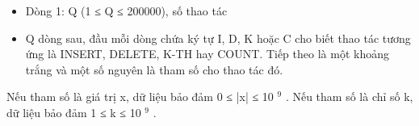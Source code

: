 \begin{itemize}
	\item     Dòng 1: Q (1 ≤ Q ≤ 200000), số thao tác   
	\item     Q dòng sau, đầu mỗi dòng chứa ký tự I, D, K hoặc C cho biết thao tác tương ứng là INSERT, DELETE, K-TH hay COUNT. Tiếp theo là một khoảng trắng và một số nguyên là tham số cho thao tác đó.   
\end{itemize}

   Nếu tham số là giá trị x, dữ liệu bảo đảm 0 ≤ |x| ≤ 10   $^    9   $   . Nếu tham số là chỉ số k, dữ liệu bảo đảm 1 ≤ k ≤ 10   $^    9   $   .